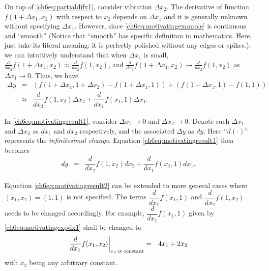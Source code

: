 On top of \eqref{ch6eq:partialdifx1}, consider vibration $\Delta x_2$. The derivative of function $f(1+\Delta x_1, x_2)$ with respect to $x_2$ depends on $\Delta x_1$ and it is generally unknown without specifying $\Delta x_1$. However, since \eqref{ch6eq:motivatingexample} is continuous and ``smooth'' (Notice that ``smooth'' has specific definition in mathematics. Here, just take its literal meaning: it is perfectly polished without any edges or spikes.), we can intuitively understand that when $\Delta x_1$ is small, $\frac{d}{dx_2}f(1+\Delta x_1, x_2) \approx \frac{d}{dx_2}f(1, x_2)$, and $\frac{d}{dx_2}f(1+\Delta x_1, x_2) \rightarrow \frac{d}{dx_2}f(1, x_2)$ as $\Delta x_1 \rightarrow 0$. Thus, we have
\begin{eqnarray}
	\Delta y &=& \left(f(1+\Delta x_1, 1 + \Delta x_2) -  f(1+\Delta x_1, 1)\right) + \left(f(1+\Delta x_1, 1) - f(1, 1)\right) \nonumber \\
	&\approx& \dfrac{d}{dx_2}f(1,x_2) \Delta x_2 + \dfrac{d}{dx_1}f(x_1,1) \Delta x_1. \label{ch6eq:motivatingresult1}
\end{eqnarray}

In \eqref{ch6eq:motivatingresult1}, consider $\Delta x_1 \rightarrow 0$ and $\Delta x_2 \rightarrow 0$. Denote such $\Delta x_1$ and $\Delta x_2$ as $dx_1$ and $dx_2$ respectively, and the associated $\Delta y$ as $dy$. Here ``$d(\cdot)$'' represents the \textit{infinitesimal change}. Equation \eqref{ch6eq:motivatingresult1} then becomes
\begin{eqnarray}
	d y &=& \dfrac{d}{dx_2}f(1,x_2) d x_2 + \dfrac{d}{dx_1}f(x_1,1) d x_1. \label{ch6eq:motivatingresult2}
\end{eqnarray}

Equation \eqref{ch6eq:motivatingresult2} can be extended to more general cases where $(x_1, x_2) = (1, 1)$ is not specified. The terms $\dfrac{d}{dx_1}f(x_1,1)$ and $\dfrac{d}{dx_2}f(1,x_2)$ needs to be changed accordingly. For example, $\dfrac{d}{dx_1}f(x_1,1)$ given by \eqref{ch6eq:motivatingexpdx1} shall be changed to
\begin{eqnarray}
	\left.\dfrac{d}{dx_1}f(x_1,x_2)\right|_{x_2 \textup{~is constant}} &=& 4x_1 + 2x_2 \nonumber
\end{eqnarray}
with $x_2$ being any arbitrary constant.

